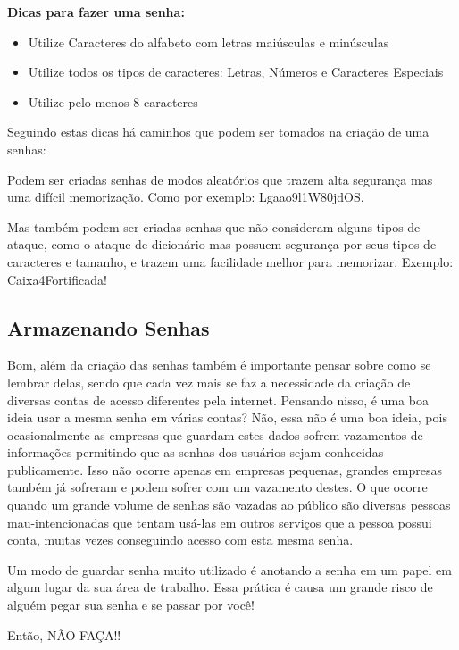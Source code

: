 \begin{ficadica}
\textbf{Dicas para fazer uma senha:}
\begin{itemize}
    \item Utilize Caracteres do alfabeto com letras maiúsculas e minúsculas
    \item Utilize todos os tipos de caracteres: Letras, Números e Caracteres Especiais
    \item Utilize pelo menos 8 caracteres
\end{itemize}
\end{ficadica}

Seguindo estas dicas há caminhos que podem ser tomados na criação de uma senhas: 

Podem ser criadas senhas de modos aleatórios que trazem alta segurança mas uma difícil memorização. Como por exemplo: Lgaao9l1W80jdOS.

Mas também podem ser criadas senhas que não consideram alguns tipos de ataque, como o ataque de dicionário mas possuem segurança por seus tipos de caracteres e tamanho, e trazem uma facilidade melhor para memorizar. Exemplo: Caixa4Fortificada!

\subsection{Armazenando Senhas}

Bom, além da criação das senhas também é importante pensar sobre como se lembrar delas, sendo que cada vez mais se faz a necessidade da criação de diversas contas de acesso diferentes pela internet. Pensando nisso, é uma boa ideia usar a mesma senha em várias contas? Não, essa não é uma boa ideia, pois ocasionalmente as empresas que guardam estes dados sofrem vazamentos de informações permitindo que as senhas dos usuários sejam conhecidas publicamente. Isso não ocorre apenas em empresas pequenas, grandes empresas também já sofreram e podem sofrer com um vazamento destes. O que ocorre quando um grande volume de senhas são vazadas ao público são diversas pessoas mau-intencionadas que tentam usá-las em outros serviços que a pessoa possui conta, muitas vezes conseguindo acesso com esta mesma senha.

\begin{atencao}
Um modo de guardar senha muito utilizado é anotando a senha em um papel em algum lugar da sua área de trabalho. Essa prática é causa um grande risco de alguém pegar sua senha e se passar por você! 

Então, NÃO FAÇA!!
\end{atencao}

